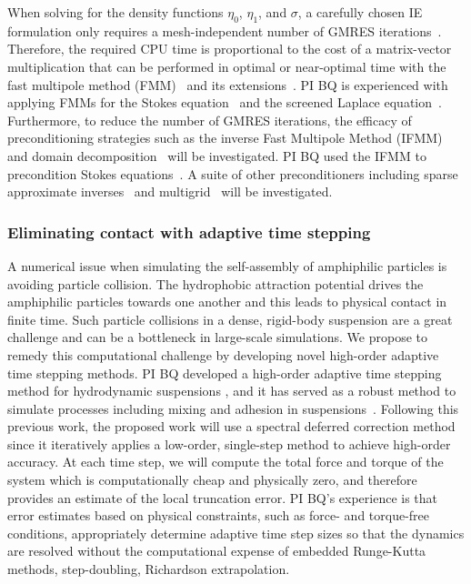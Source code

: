 When solving for the density functions $\eta_0$, $\eta_1$, and $\sigma$,
a carefully chosen IE formulation only requires a mesh-independent
number of GMRES iterations~\cite{cam-ips-kel-mey-xue1996}. Therefore,
the required CPU time is proportional to the cost of a matrix-vector
multiplication that can be performed in optimal or near-optimal time
with the fast multipole method (FMM)~\cite{fmm5} and its
extensions~\cite{fmm1, fmm2, fmm3, fmm4, fmm6, fmm7, fmm8}. PI BQ is
experienced with applying FMMs for the Stokes
equation~\cite{qua-bir2014, bys-sha-qua2020} and the screened Laplace
equation~\cite{kro-qua2011, qua2011}. Furthermore, to reduce the number
of GMRES iterations, the efficacy of preconditioning strategies such as
the inverse Fast Multipole Method (IFMM)~\cite{cou-pou-dar2017} and
domain decomposition~\cite{che-bir2021} will be investigated. PI BQ used
the IFMM to precondition Stokes equations~\cite{qua-cou-dar2018}. A
suite of other preconditioners including sparse approximate
inverses~\cite{che2000} and multigrid~\cite{hem-sch1981, sch1982} will
be investigated.


\subsubsection{Eliminating contact with adaptive time stepping}
\label{subsec:timeStepping}

A numerical issue when simulating the self-assembly of amphiphilic
particles is avoiding particle collision. The hydrophobic attraction
potential drives the amphiphilic particles towards one another and this
leads to physical contact in finite time. Such particle collisions in a
dense, rigid-body suspension are a great challenge and can be a
bottleneck in large-scale simulations. We propose to remedy this
computational challenge by developing novel high-order adaptive time
stepping methods. PI BQ developed a high-order adaptive time
stepping method for hydrodynamic suspensions \cite{qua-bir2016}, and it
has served as a robust method to simulate processes including mixing and
adhesion in suspensions~\cite{qua-vee-you2019, kab-qua-bir2017}.
Following this previous work, the proposed work will use a spectral
deferred correction method~\cite{dut-gre-rok2000} since it iteratively
applies a low-order, single-step method to achieve high-order accuracy.
At each time step, we will compute the total force and torque of the
system which is computationally cheap and physically zero, and therefore
provides an estimate of the local truncation error. PI BQ's experience
is that error estimates based on physical constraints, such as force-
and torque-free conditions, appropriately determine adaptive time step
sizes so that the dynamics are resolved without the computational
expense of embedded Runge-Kutta methods, step-doubling, Richardson
extrapolation.



